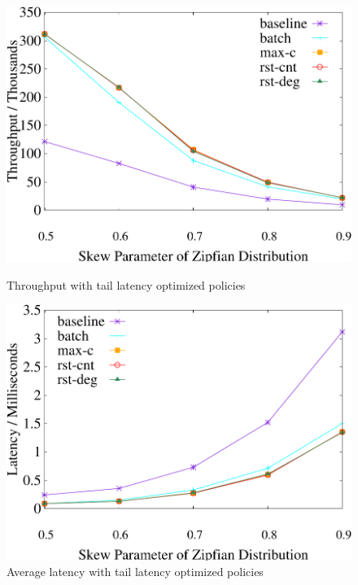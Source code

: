 \begin{figure}[t]
    \centering
	\begin{minipage}[b]{0.31\linewidth}
	\centering
	\includegraphics[width=\textwidth]{./exp_fig/restart/tps}
	\vspace{-2em}
	\caption{Throughput with tail latency optimized policies}
	\label{fig:restart:tps}
	\end{minipage}
    \begin{minipage}[b]{0.31\linewidth}
	\centering
	\includegraphics[width=\textwidth]{./exp_fig/restart/latency}
	\vspace{-2em}
	\caption{Average latency with tail latency optimized policies}
	\label{fig:restart:latency}
	\end{minipage}

\end{figure}
